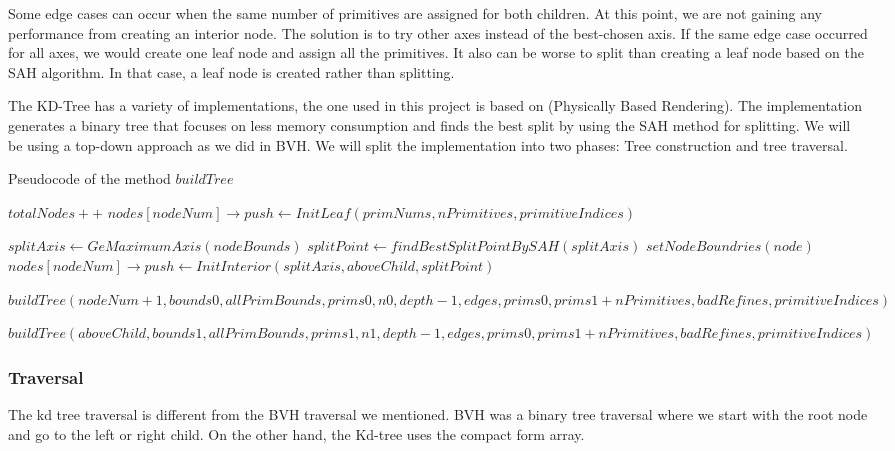 \documentclass[11pt,a4paper]{article}
\begin{document}
Some edge cases can occur when the same number of primitives are assigned for both children. At this point, we are not gaining any performance from creating an interior node. The solution is to try other axes instead of the best-chosen axis. If the same edge case occurred for all axes, we would create one leaf node and assign all the primitives. It also can be worse to split than creating a leaf node based on the SAH algorithm. In that case, a leaf node is created rather than splitting. 
\\
\noindent

The KD-Tree has a variety of implementations, the one used in this project is based on (Physically Based Rendering). The implementation generates a binary tree that focuses on less memory consumption and finds the best split by using the SAH method for splitting. We will be using a top-down approach as we did in BVH. We will split the implementation into two phases: Tree construction and tree traversal.



\begin{algorithm}[H]
\caption{Pseudocode of the method $buildTree$}\label{alg:alg1}
\begin{algorithmic}
\State $totalNodes++$
	\State $nodes[nodeNum] \rightarrow push \gets InitLeaf(primNums, nPrimitives, primitiveIndices)$
	\State \Return
\EndIf

\State $splitAxis \gets GeMaximumAxis(nodeBounds)$
\State $splitPoint \gets findBestSplitPointBySAH(splitAxis)$
\State $setNodeBoundries(node)$
\State $nodes[nodeNum] \rightarrow push \gets InitInterior(splitAxis, aboveChild, splitPoint)$

\State $buildTree(nodeNum+1, bounds0, allPrimBounds, prims0, n0, depth - 1, edges, prims0, prims1 + nPrimitives, badRefines, primitiveIndices)$

\State $buildTree(aboveChild, bounds1, allPrimBounds, prims1, n1, depth - 1, edges, prims0, prims1 + nPrimitives, badRefines, primitiveIndices)$

\EndFunction
\end{algorithmic}
\end{algorithm}

\subsubsection{Traversal}
The kd tree traversal is different from the BVH traversal we mentioned. BVH was a binary tree traversal where we start with the root node and go to the left or right child. On the other hand, the Kd-tree uses the compact form array. 
\end{document}
